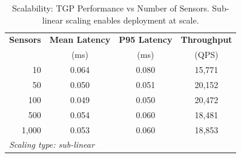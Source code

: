 
\begin{table}[t]
\centering
\caption{Scalability: TGP Performance vs Number of Sensors.
Sub-linear scaling enables deployment at scale.}
\label{tab:scalability}
\begin{tabular}{r c c c}
\toprule
\textbf{Sensors} & \textbf{Mean Latency} & \textbf{P95 Latency} & \textbf{Throughput} \\
 & (ms) & (ms) & (QPS) \\
\midrule
10 & 0.064 & 0.080 & 15,771 \\
50 & 0.050 & 0.051 & 20,152 \\
100 & 0.049 & 0.050 & 20,472 \\
500 & 0.054 & 0.060 & 18,481 \\
1,000 & 0.053 & 0.060 & 18,853 \\
\midrule
\multicolumn{4}{l}{\textit{Scaling type: sub-linear}} \\

\bottomrule
\end{tabular}
\end{table}
